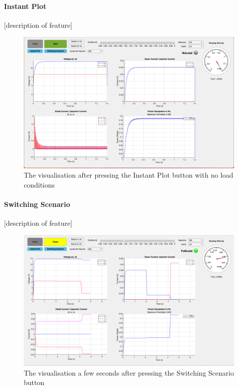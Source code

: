\pagebreak
\paragraph{Instant Plot} [description of feature]
\begin{figure}[H]
     \centering
     \includegraphics[width=\textwidth]{graphics/visualisation/no_load_instant_plot}
     \caption{The visualisation after pressing the Instant Plot button with no load conditions}
\end{figure}

\paragraph{Switching Scenario} [description of feature]
\begin{figure}[H]
   \centering
   \includegraphics[width=\textwidth]{graphics/visualisation/switching_3}
   \caption{The visualisation a few seconds after pressing the Switching Scenario button}
\end{figure}

